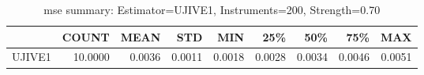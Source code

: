 \begin{table}[ht]
\centering
\caption{mse summary: Estimator=UJIVE1, Instruments=200, Strength=0.70}
\begin{tabular}{lrrrrrrrr}
\toprule
 & COUNT & MEAN & STD & MIN & 25\% & 50\% & 75\% & MAX \\
\midrule
UJIVE1 & 10.0000 & 0.0036 & 0.0011 & 0.0018 & 0.0028 & 0.0034 & 0.0046 & 0.0051 \\
\bottomrule
\end{tabular}
\end{table}
